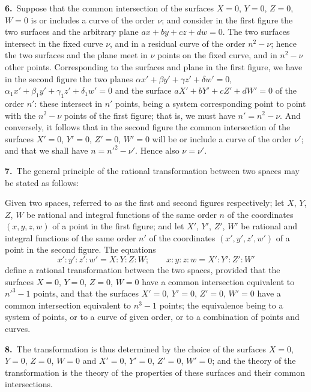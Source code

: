 \documentclass[11pt,a4paper]{article}
\begin{document}
\textbf{6.}\ Suppose that the common intersection of the surfaces $X = 0$, $Y = 0$, $Z = 0$, $W = 0$ is or includes a curve of the order $\nu$; and consider in the first figure the two surfaces and the arbitrary plane $ax + by + cz + dw = 0$. The two surfaces intersect in the fixed curve $\nu$, and in a residual curve of the order $n^2 - \nu$; hence the two surfaces and the plane meet in $\nu$ points on the fixed curve, and in $n^2 - \nu$ other points. Corresponding to the surfaces and plane in the first figure, we have in the second figure the two planes $\alpha x' + \beta y' + \gamma z' + \delta w' = 0$, $\alpha_1 x' + \beta_1 y' + \gamma_1 z' + \delta_1 w' = 0$ and the surface $aX' + bY' + cZ' + dW' = 0$ of the order $n'$: these intersect in $n'$ points, being a system corresponding point to point with the $n^2 - \nu$ points of the first figure; that is, we must have $n' = n^2 - \nu$. And conversely, it follows that in the second figure the common intersection of the surfaces $X' = 0$, $Y' = 0$, $Z' = 0$, $W' = 0$ will be or include a curve of the order $\nu'$; and that we shall have $n = n'^2 - \nu'$. Hence also $\nu = \nu'$.

\newpage
\setcounter{page}{193}

\noindent\textbf{7.}\ The general principle of the rational transformation between two spaces may be stated as follows:

Given two spaces, referred to as the first and second figures respectively; let $X$, $Y$, $Z$, $W$ be rational and integral functions of the same order $n$ of the coordinates $(x, y, z, w)$ of a point in the first figure; and let $X'$, $Y'$, $Z'$, $W'$ be rational and integral functions of the same order $n'$ of the coordinates $(x', y', z', w')$ of a point in the second figure. The equations
\[
x' : y' : z' : w' = X : Y : Z : W;\qquad x : y : z : w = X' : Y' : Z' : W'
\]
define a rational transformation between the two spaces, provided that the surfaces $X = 0$, $Y = 0$, $Z = 0$, $W = 0$ have a common intersection equivalent to $n'^3 - 1$ points, and that the surfaces $X' = 0$, $Y' = 0$, $Z' = 0$, $W' = 0$ have a common intersection equivalent to $n^3 - 1$ points; the equivalence being to a system of points, or to a curve of given order, or to a combination of points and curves.

\textbf{8.}\ The transformation is thus determined by the choice of the surfaces $X = 0$, $Y = 0$, $Z = 0$, $W = 0$ and $X' = 0$, $Y' = 0$, $Z' = 0$, $W' = 0$; and the theory of the transformation is the theory of the properties of these surfaces and their common intersections.
\end{document}
